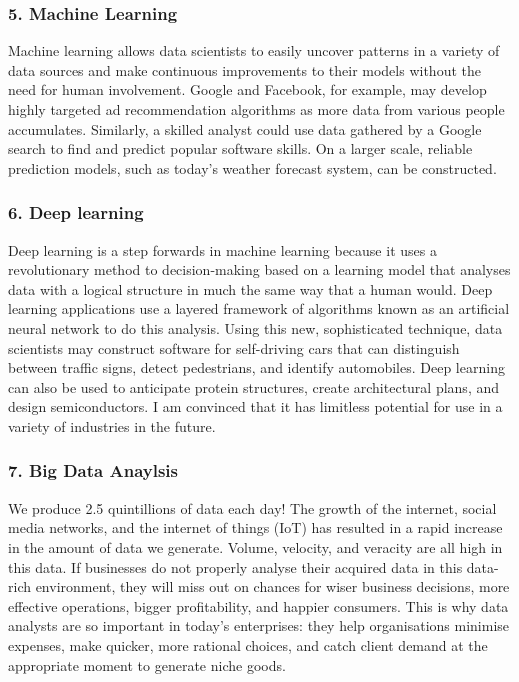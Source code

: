 \documentclass[a4paper, 11pt]{report}
\begin{document}
    \subsubsection{5. Machine Learning}
    Machine learning allows data scientists to easily uncover patterns in a variety of data sources and make continuous improvements to their models without the need for human involvement.\cite{isaac5} Google and Facebook, for example, may develop highly targeted ad recommendation algorithms as more data from various people accumulates. Similarly, a skilled analyst could use data gathered by a Google search to find and predict popular software skills. On a larger scale, reliable prediction models, such as today's weather forecast system, can be constructed.\cite{isaac1}

    \subsubsection{6. Deep learning}
    Deep learning is a step forwards in machine learning because it uses a revolutionary method to decision-making based on a learning model that analyses data with a logical structure in much the same way that a human would.\cite{isaac5} Deep learning applications use a layered framework of algorithms known as an artificial neural network to do this analysis.\cite{isaac5} Using this new, sophisticated technique, data scientists may construct software for self-driving cars that can distinguish between traffic signs, detect pedestrians, and identify automobiles. \cite{isaac1} Deep learning can also be used to anticipate protein structures, create architectural plans, and design semiconductors. I am convinced that it has limitless potential for use in a variety of industries in the future.

    \subsubsection{7. Big Data Anaylsis}
    We produce 2.5 quintillions of data each day!\cite{isaac1} The growth of the internet, social media networks, and the internet of things (IoT) has resulted in a rapid increase in the amount of data we generate. Volume, velocity, and veracity are all high in this data.\cite{isaac6} If businesses do not properly analyse their acquired data in this data-rich environment, they will miss out on chances for wiser business decisions, more effective operations, bigger profitability, and happier consumers.\cite{isaac6} This is why data analysts are so important in today's enterprises: they help organisations minimise expenses, make quicker, more rational choices, and catch client demand at the appropriate moment to generate niche goods.\cite{isaac1}
\end{document}
